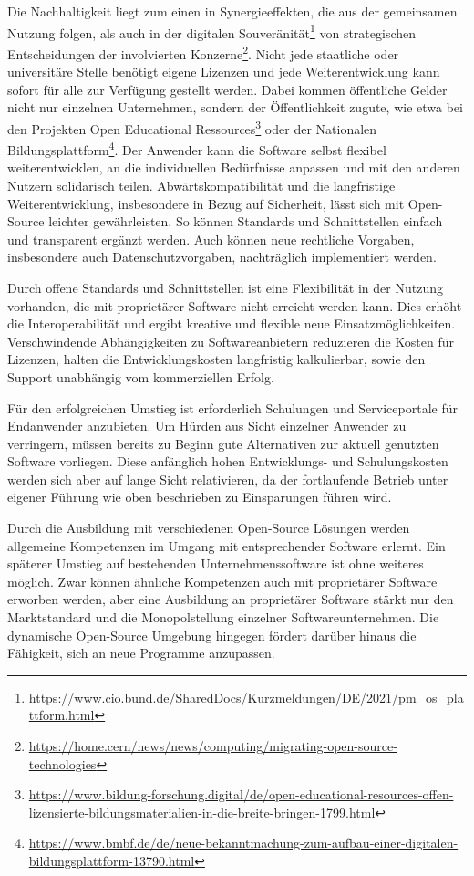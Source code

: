 \documentclass[DIV=calc]{scrartcl}
\begin{document}
Die Nachhaltigkeit liegt zum einen in Synergieeffekten, die aus der gemeinsamen Nutzung folgen, als auch in der digitalen Souveränität\footnote{\url{https://www.cio.bund.de/SharedDocs/Kurzmeldungen/DE/2021/pm_os_plattform.html}} von strategischen Entscheidungen der involvierten Konzerne\footnote{\url{https://home.cern/news/news/computing/migrating-open-source-technologies}}. Nicht jede staatliche oder universitäre Stelle benötigt eigene Lizenzen und jede Weiterentwicklung kann sofort für alle zur Verfügung gestellt werden. Dabei kommen öffentliche Gelder nicht nur einzelnen Unternehmen, sondern der Öffentlichkeit zugute, wie etwa bei den Projekten Open Educational Ressources\footnote{\url{https://www.bildung-forschung.digital/de/open-educational-resources-offen-lizensierte-bildungsmaterialien-in-die-breite-bringen-1799.html}} oder der Nationalen Bildungsplattform\footnote{\url{https://www.bmbf.de/de/neue-bekanntmachung-zum-aufbau-einer-digitalen-bildungsplattform-13790.html}}. Der Anwender kann die Software selbst flexibel weiterentwicklen, an die individuellen Bedürfnisse anpassen und mit den anderen Nutzern solidarisch teilen. Abwärtskompatibilität und die langfristige Weiterentwicklung, insbesondere in Bezug auf Sicherheit, lässt sich mit Open-Source leichter gewährleisten. So können Standards und Schnittstellen einfach und transparent ergänzt werden. Auch können neue rechtliche Vorgaben, insbesondere auch Datenschutzvorgaben, nachträglich implementiert werden.

Durch offene Standards und Schnittstellen ist eine Flexibilität in der Nutzung vorhanden, die mit proprietärer Software nicht erreicht werden kann. Dies erhöht die Interoperabilität und ergibt kreative und flexible neue Einsatzmöglichkeiten. Verschwindende Abhängigkeiten zu Softwareanbietern reduzieren die Kosten für Lizenzen, halten die Entwicklungskosten langfristig kalkulierbar, sowie den Support unabhängig vom kommerziellen Erfolg.

Für den erfolgreichen Umstieg ist erforderlich Schulungen und Serviceportale für Endanwender anzubieten. 
Um Hürden aus Sicht einzelner Anwender zu verringern, müssen bereits zu Beginn gute Alternativen zur aktuell genutzten Software vorliegen. Diese anfänglich hohen Entwicklungs- und Schulungskosten werden sich aber auf lange Sicht relativieren, da der fortlaufende Betrieb unter eigener Führung wie oben beschrieben zu Einsparungen führen wird. 

Durch die Ausbildung mit verschiedenen Open-Source Lösungen werden allgemeine Kompetenzen im Umgang mit entsprechender Software erlernt. Ein späterer Umstieg auf bestehenden Unternehmenssoftware ist ohne weiteres möglich. Zwar können ähnliche Kompetenzen auch mit proprietärer Software erworben werden, aber eine Ausbildung an proprietärer Software stärkt nur den Marktstandard und die Monopolstellung einzelner Softwareunternehmen. Die dynamische Open-Source Umgebung hingegen fördert darüber hinaus die Fähigkeit, sich an neue Programme anzupassen. 
\end{document}
